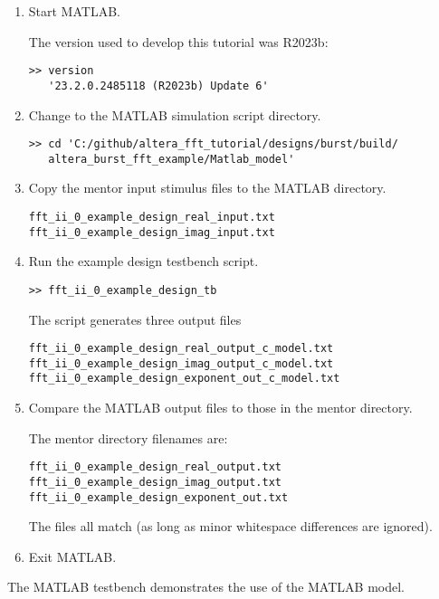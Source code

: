\begin{enumerate}
\item Start MATLAB.

The version used to develop this tutorial was R2023b:
%
\begin{verbatim}
>> version
   '23.2.0.2485118 (R2023b) Update 6'
\end{verbatim}
%
\item Change to the MATLAB simulation script directory.
%
\begin{verbatim}
>> cd 'C:/github/altera_fft_tutorial/designs/burst/build/
   altera_burst_fft_example/Matlab_model'
\end{verbatim}

\item Copy the mentor input stimulus files to the MATLAB directory.
%
\begin{verbatim}
fft_ii_0_example_design_real_input.txt
fft_ii_0_example_design_imag_input.txt
\end{verbatim}

\item Run the example design testbench script.
%
\begin{verbatim}
>> fft_ii_0_example_design_tb
\end{verbatim}
%
The script generates three output files
%
\begin{verbatim}
fft_ii_0_example_design_real_output_c_model.txt
fft_ii_0_example_design_imag_output_c_model.txt
fft_ii_0_example_design_exponent_out_c_model.txt
\end{verbatim}

\item Compare the MATLAB output files to those in the mentor directory.

The mentor directory filenames are:
%
\begin{verbatim}
fft_ii_0_example_design_real_output.txt
fft_ii_0_example_design_imag_output.txt
fft_ii_0_example_design_exponent_out.txt
\end{verbatim}
%
The files all match (as long as minor whitespace differences are ignored).
%
\item Exit MATLAB.
\end{enumerate}
%
The MATLAB testbench demonstrates the use of the MATLAB model.